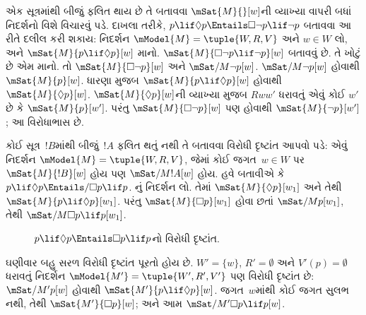 \begin{ex}
  એક સૂત્રમાંથી બીજું ફલિત થાય છે તે બતાવવા
  $\mSat{M}{}[w]$ની વ્યાખ્યા વાપરી બધાં નિદર્શનો
  વિશે વિચારવું પડે. દાખલા તરીકે,
  $p \lif \Diamond p \Entails \Box\lnot p \lif \lnot p$
  બતાવવા આ રીતે દલીલ કરી શકાય: નિદર્શન
  $\mModel{M} = \tuple{W, R,
    V}$ અને $w \in W$ લો, અને $\mSat{M}{p \lif \Diamond
    p}[w]$ માનો. $\mSat{M}{\Box\lnot p \lif \lnot
    p}[w]$ બતાવવું છે. તે ખોટું છે એમ માનો. તો
  $\mSat{M}{\Box\lnot p}[w]$ અને
  $\mSat/{M}{\lnot p}[w]$. $\mSat/{M}{\lnot p}[w]$
  હોવાથી $\mSat{M}{p}[w]$. ધારણા મુજબ
  $\mSat{M}{p \lif \Diamond p}[w]$ હોવાથી
  $\mSat{M}{\Diamond p}[w]$. $\mSat{M}{\Diamond
    p}[w]$ની વ્યાખ્યા મુજબ $Rww'$ ધરાવતું એવું કોઈ
  $w'$ છે કે $\mSat{M}{p}[w']$. પરંતુ
  $\mSat{M}{\Box \lnot p}[w]$ પણ હોવાથી
  $\mSat{M}{\lnot p}[w']$; આ વિરોધાભાસ છે.

  કોઈ સૂત્ર~$!B$માંથી બીજું~$!A$ ફલિત થતું
  નથી તે બતાવવા વિરોધી દૃષ્ટાંત આપવો પડે: એવું
  નિદર્શન $\mModel{M} = \tuple{W, R,
    V}$, જેમાં કોઈ જગત~$w \in W$ પર $\mSat{M}{!B}[w]$
  હોય પણ $\mSat/{M}{!A}[w]$ હોય. હવે બતાવીએ કે
  $p \lif \Diamond p \Entails/
  \Box p \lif p$. નું નિદર્શન લો.
  તેમાં $\mSat{M}{\Diamond p}[w_1]$ અને તેથી
  $\mSat{M}{p \lif
    \Diamond p}[w_1]$. પરંતુ $\mSat{M}{\Box p}[w_1]$
  હોવા છતાં $\mSat/{M}{p}[w_1]$, તેથી
  $\mSat/{M}{\Box p \lif p}[w_1]$.
  \begin{figure}
  \begin{center}
  \end{center}
  \caption{$p \lif \Diamond p \Entails \Box p \lif p$નો વિરોધી દૃષ્ટાંત.}
  \end{figure}

  ઘણીવાર બહુ સરળ વિરોધી દૃષ્ટાંત પૂરતો હોય છે.
  $W' = \{w\}$, $R' = \emptyset$ અને $V'(p) =
  \emptyset$ ધરાવતું નિદર્શન $\mModel{M'} =
  \tuple{W', R', V'}$ પણ વિરોધી દૃષ્ટાંત છે:
  $\mSat/{M'}{p}[w]$ હોવાથી
  $\mSat{M'}{p \lif \Diamond p}[w]$. જગત~$w$માંથી
  કોઈ જગત સુલભ નથી, તેથી $\mSat{M'}{\Box p}[w]$;
  અને આમ $\mSat/{M'}{\Box p
    \lif p}[w]$.
\end{ex}

